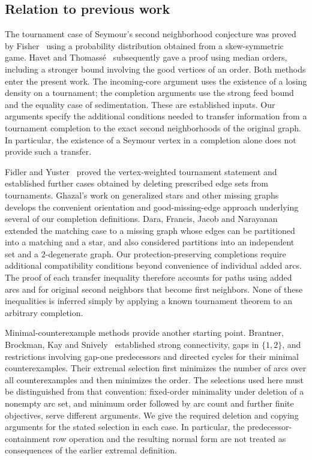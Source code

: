 \subsection{Relation to previous work}
\label{subsec:related-work}

The tournament case of Seymour's second neighborhood conjecture was proved
by Fisher~\cite{Fisher1996} using a probability distribution obtained from
a skew-symmetric game. Havet and Thomass\'e~\cite{HavetThomasse2000}
subsequently gave a proof using median orders, including a stronger bound
involving the good vertices of an order. Both methods enter the present
work. The incoming-core argument uses the existence of a losing density
on a tournament; the completion arguments use the strong feed bound and
the equality case of sedimentation. These are established inputs. Our
arguments specify the additional conditions needed to transfer information
from a tournament completion to the exact second neighborhoods of the
original graph. In particular, the existence of a Seymour vertex in a
completion alone does not provide such a transfer.

Fidler and Yuster~\cite{FidlerYuster2007} proved the vertex-weighted
tournament statement and established further cases obtained by deleting
prescribed edge sets from tournaments. Ghazal's work on generalized stars
and other missing graphs~\cite{Ghazal2012,Ghazal2013} develops the convenient
orientation and good-missing-edge approach underlying several of our
completion definitions. Dara, Francis, Jacob and
Narayanan~\cite{DaraEtAl2022} extended the matching case to a missing graph
whose edges can be partitioned into a matching and a star, and also
considered partitions into an independent set and a $2$-degenerate graph.
Our protection-preserving completions require additional compatibility
conditions beyond convenience of individual added arcs. The proof of each
transfer inequality therefore accounts for paths using added arcs and for
original second neighbors that become first neighbors. None of these
inequalities is inferred simply by applying a known tournament theorem to
an arbitrary completion.

Minimal-counterexample methods provide another starting point.
Brantner, Brockman, Kay and Snively~\cite{BrantnerEtAl2009} established
strong connectivity, gaps in $\{1,2\}$, and restrictions involving
gap-one predecessors and directed cycles for their minimal counterexamples.
Their extremal selection first minimizes the number of arcs over all
counterexamples and then minimizes the order. The selections used here
must be distinguished from that convention: fixed-order minimality under
deletion of a nonempty arc set, and minimum order followed by arc count
and further finite objectives, serve different arguments. We give the
required deletion and copying arguments for the stated selection in each
case. In particular, the predecessor-containment row operation and the
resulting normal form are not treated as consequences of the earlier
extremal definition.

